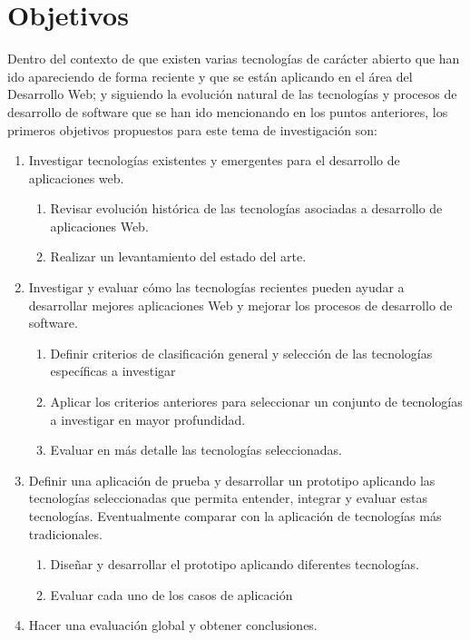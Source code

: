 \section{Objetivos}
Dentro del contexto de que existen varias tecnologías de carácter abierto que han ido apareciendo
de forma reciente y que se están aplicando en el área del Desarrollo Web; y siguiendo la evolución natural
de las tecnologías y procesos de desarrollo de software que se han ido mencionando en los puntos anteriores,
los primeros objetivos propuestos para este tema de investigación son:

\begin{enumerate}
 \item Investigar tecnologías existentes y emergentes para el desarrollo de aplicaciones web.
 \begin{enumerate}
   \item  Revisar evolución histórica de las tecnologías asociadas a desarrollo de aplicaciones Web.
   \item  Realizar un levantamiento del estado del arte.
 \end{enumerate}
 \item Investigar y evaluar cómo las tecnologías recientes pueden ayudar a desarrollar mejores aplicaciones Web y  mejorar los procesos de desarrollo de software.
 \begin{enumerate}
   \item Definir criterios de clasificación general y selección de las tecnologías específicas a investigar
   \item Aplicar los criterios anteriores para seleccionar un conjunto de tecnologías a investigar en mayor profundidad.
   \item Evaluar en más detalle las tecnologías seleccionadas.
 \end{enumerate}
 \item Definir una aplicación de prueba y desarrollar un prototipo aplicando las tecnologías seleccionadas que permita entender, integrar y evaluar estas tecnologías. Eventualmente comparar con la aplicación de tecnologías más tradicionales.
 \begin{enumerate}
   \item Diseñar y desarrollar el prototipo aplicando diferentes tecnologías.
   \item Evaluar cada uno de los casos de aplicación
 \end{enumerate}
 \item Hacer una evaluación global y obtener conclusiones.
\end{enumerate}

